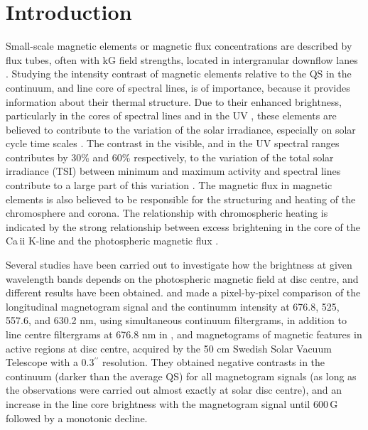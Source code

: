 \documentclass[goettingen, gauss, print]{thesis}
\begin{document}
\section{Introduction} 
Small-scale magnetic elements or magnetic flux concentrations are described by flux tubes, often with kG field strengths, located in intergranular downflow lanes \citep{solanki_small-scale_1993}. 
Studying the intensity contrast of magnetic elements relative to the QS in the continuum, and line core of spectral lines, is of importance, because it provides information about their thermal structure. Due to their enhanced brightness, particularly in the cores of spectral lines \citep[]{title_differences_1992, yeo_intensity_2013} and in the UV \citep{riethmuller_bright_2010}, these elements are believed to contribute to the variation of the solar irradiance, especially on solar cycle time scales \citep{foukal_magnetic_1988,fligge_modelling_2000, krivova_reconstruction_2003, yeo_solar_2014}. The contrast in the visible, and in the UV spectral ranges contributes by 30\% and 60\% respectively, to the variation of the total solar irradiance (TSI) between minimum and maximum activity \citep{krivova_reconstruction_2006} and spectral lines contribute to a large part of this variation \citep[]{livingston_spectrum_1988, shapiro_role_2015}.
The magnetic flux in magnetic elements is also believed to be responsible for the structuring and heating of the chromosphere and corona. The relationship with chromospheric heating is indicated by the strong relationship between excess brightening in the core of the Ca\,{\sc ii} K-line and the photospheric magnetic flux \citep[e.g.,][]{skumanich_statistical_1975,schrijver_relations_1989,loukitcheva_relationship_2009}.  

Several studies have been carried out to investigate how the brightness at given wavelength bands depends on the photospheric magnetic field at disc centre, and different results have been obtained. \citet{title_differences_1992} and \cite{topka_properties_1992} made a pixel-by-pixel comparison of the longitudinal magnetogram signal and the continumm intensity at 676.8, 525, 557.6, and 630.2 nm, using simultaneous continuum filtergrams, in addition to line centre filtergrams at 676.8 nm in \cite{title_differences_1992}, and magnetograms of magnetic features in active regions at disc centre, acquired by the 50 cm Swedish Solar Vacuum Telescope with a 0.3$^{\prime\prime}$ resolution. They obtained negative contrasts in the continuum (darker than the average QS) for all magnetogram signals (as long as the observations were carried out almost exactly at solar disc centre), and an increase in the line core brightness with the magnetogram signal until 600\,G followed by a monotonic decline.
\end{document}
